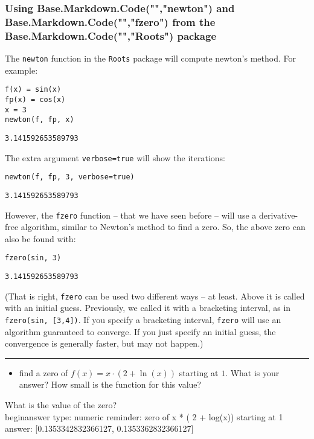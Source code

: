 \documentclass[12pt]{article}
\begin{document}
\subsubsection{Using Base.Markdown.Code("","newton") and Base.Markdown.Code("","fzero") from the Base.Markdown.Code("","Roots") package}\newline
The \texttt{newton} function in the \texttt{Roots} package will compute newton's method. For example:\begin{verbatim}
f(x) = sin(x)
fp(x) = cos(x)
x = 3
newton(f, fp, x)
\end{verbatim}
\begin{verbatim}
3.141592653589793\end{verbatim}
\newline
The extra argument \texttt{verbose=true} will show the iterations:\begin{verbatim}
newton(f, fp, 3, verbose=true)
\end{verbatim}
\begin{verbatim}
3.141592653589793\end{verbatim}
\newline
However, the \texttt{fzero} function – that we have seen before – will use a derivative-free algorithm, similar to Newton's method to find a zero. So, the above zero can also be found with:\begin{verbatim}
fzero(sin, 3)
\end{verbatim}
\begin{verbatim}
3.141592653589793\end{verbatim}
\newline
(That is right, \texttt{fzero} can be used two different ways – at least. Above it is called with an initial guess. Previously, we called it with a bracketing interval, as in \texttt{fzero(sin, [3,4])}. If you specify a bracketing interval, \texttt{fzero} will use an algorithm guaranteed to converge. If you just specify an initial guess, the convergence is generally faster, but may not happen.)\rule{\textwidth}{1pt}
\begin{itemize}\item find a zero of $f(x) = x\cdot (2+\ln(x))$ starting at $1$. What is   your answer? How small is the function for this value?\end{itemize}\newline
What is the value of the zero?
\\begin{answer}
    type: numeric
    reminder: zero of x * ( 2 + log(x)) starting at 1
    answer: [0.1353342832366127, 0.1353362832366127]
\end{document}
